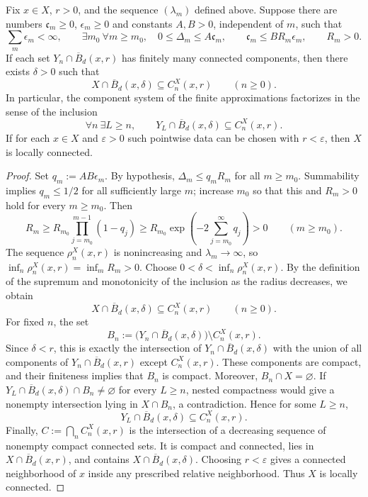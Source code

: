 \begin{theorem}
\label{thm:abstract-summable-cut}
Fix \(x\in X\), \(r>0\), and the sequence \((\lambda_m)\) defined
above. Suppose there are numbers \(\mathfrak c_m\ge0\),
\(\epsilon_m\ge0\) and constants \(A,B>0\), independent of \(m\), such
that
\[
 \sum_m\epsilon_m<\infty,\qquad
 \exists m_0\ \forall m\ge m_0,\quad
 0\le\Delta_m\le A\mathfrak c_m,\qquad
 \mathfrak c_m\le B R_m\epsilon_m,\qquad R_m>0.
\]
If each set \(Y_n\cap\overline B_d(x,r)\) has finitely many connected
components, then there exists \(\delta>0\) such that
\[
 X\cap\overline B_d(x,\delta)\subseteq C_n^X(x,r)
 \qquad(n\ge0).
\]
In particular, the component system of the finite approximations
factorizes in the sense of the inclusion
\[
 \forall n\ \exists L\ge n,\qquad
 Y_L\cap\overline B_d(x,\delta)\subseteq C_n^X(x,r).
\]
If for each \(x\in X\) and \(\varepsilon>0\) such pointwise data can be
chosen with \(r<\varepsilon\), then \(X\) is locally connected.
\end{theorem}
\begin{proof}
Set \(q_m:=AB\epsilon_m\). By hypothesis,
\(\Delta_m\le q_mR_m\) for all \(m\ge m_0\). Summability implies
\(q_m\le1/2\) for all sufficiently large \(m\); increase \(m_0\) so
that this and \(R_m>0\) hold for every \(m\ge m_0\). Then
\[
 R_m\ge R_{m_0}\prod_{j=m_0}^{m-1}(1-q_j)
 \ge R_{m_0}\exp\!\left(-2\sum_{j=m_0}^{\infty}q_j\right)>0
 \qquad(m\ge m_0).
\]
The sequence \(\rho_n^X(x,r)\) is nonincreasing and
\(\lambda_m\to\infty\), so
\(\inf_n\rho_n^X(x,r)=\inf_mR_m>0\). Choose
\(0<\delta<\inf_n\rho_n^X(x,r)\). By the definition of the supremum
and monotonicity of the inclusion as the radius decreases, we obtain
\[
 X\cap\overline B_d(x,\delta)\subseteq C_n^X(x,r)
 \qquad(n\ge0).
\]
For fixed \(n\), the set
\[
 B_n:=\bigl(Y_n\cap\overline B_d(x,\delta)\bigr)
       \setminus C_n^X(x,r).
\]
Since \(\delta<r\), this is exactly the intersection of
\(Y_n\cap\overline B_d(x,\delta)\) with the union of all components of
\(Y_n\cap\overline B_d(x,r)\) except \(C_n^X(x,r)\). These components
are compact, and their finiteness implies that \(B_n\) is compact.
Moreover, \(B_n\cap X=\varnothing\). If
\(Y_L\cap\overline B_d(x,\delta)\cap B_n\ne\varnothing\) for every
\(L\ge n\), nested compactness would give a nonempty intersection lying
in \(X\cap B_n\), a contradiction. Hence for some \(L\ge n\),
\[
 Y_L\cap\overline B_d(x,\delta)\subseteq C_n^X(x,r).
\]
Finally, \(C:=\bigcap_n C_n^X(x,r)\) is the intersection of a
decreasing sequence of nonempty compact connected sets. It is compact
and connected, lies in \(X\cap\overline B_d(x,r)\), and contains
\(X\cap\overline B_d(x,\delta)\). Choosing \(r<\varepsilon\) gives a
connected neighborhood of \(x\) inside any prescribed relative
neighborhood. Thus \(X\) is locally connected.
\end{proof}

